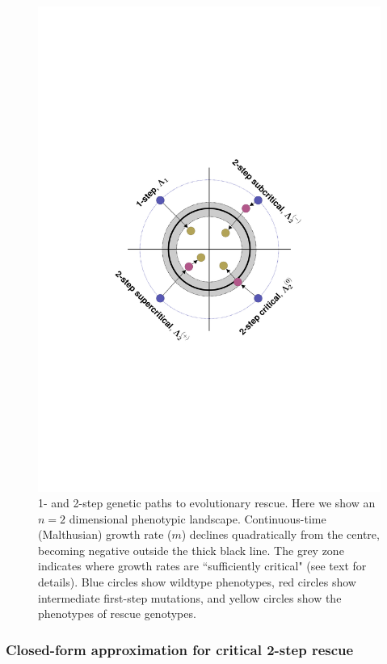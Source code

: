 \documentclass[9pt,twocolumn,twoside,lineno]{gsajnl}
\begin{document}
\begin{figure}[htb]
\centering
\includegraphics[width=\linewidth, trim = {14cm, 35cm, 14cm, 35cm}, clip]{fgmer_diagrams_code.pdf}
\caption{
1- and 2-step genetic paths to evolutionary rescue.
Here we show an $n=2$ dimensional phenotypic landscape.
Continuous-time (Malthusian) growth rate ($m$) declines quadratically from the centre, becoming negative outside the thick black line.
The grey zone indicates where growth rates are ``sufficiently critical" (see text for details).
Blue circles show wildtype phenotypes, red circles show intermediate first-step mutations, and yellow circles show the phenotypes of rescue genotypes.
}%
\label{fig:paths}
\end{figure}

\subsubsection{Closed-form approximation for critical 2-step rescue}
\end{document}
